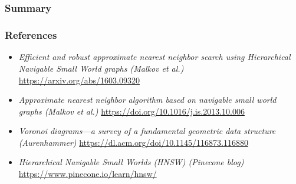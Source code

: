 \documentclass{beamer}
\begin{document}
\section{}
  \begin{frame}
    \frametitle{Summary}  
    \Large
   	\begin{itemize}
	\end{itemize}
  \end{frame}

  \begin{frame}
    \frametitle{References}  
    \small
    \begin{itemize}
	\item \textit{Efficient and robust approximate nearest neighbor search using Hierarchical Navigable Small World graphs (Malkov et al.)} \url{https://arxiv.org/abs/1603.09320}    

	\item \textit{Approximate nearest neighbor algorithm based on navigable small world graphs (Malkov et al.)} \url{https://doi.org/10.1016/j.is.2013.10.006}	
	\item \textit{Voronoi diagrams—a survey of a fundamental geometric data structure (Aurenhammer)} \url{https://dl.acm.org/doi/10.1145/116873.116880}
	\item \textit{Hierarchical Navigable Small Worlds (HNSW) (Pinecone blog)} \url{https://www.pinecone.io/learn/hnsw/}
	\end{itemize}
	
  \end{frame}
\end{document}

